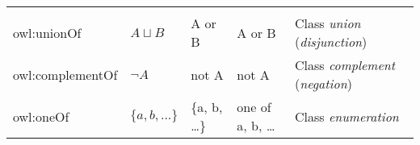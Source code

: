 \documentclass[a4paper,]{report}
\begin{document}
\begin{longtable}[]{@{}lllll@{}}
\begin{minipage}[t]{0.14\columnwidth}
\end{minipage}\tabularnewline
\begin{minipage}[t]{0.18\columnwidth}\raggedright
owl:unionOf\strut
\end{minipage} & \begin{minipage}[t]{0.16\columnwidth}\raggedright
\(A\sqcup B\)\strut
\end{minipage} & \begin{minipage}[t]{0.17\columnwidth}\raggedright
A or B\strut
\end{minipage} & \begin{minipage}[t]{0.20\columnwidth}\raggedright
A or B\strut
\end{minipage} & \begin{minipage}[t]{0.14\columnwidth}\raggedright
Class \emph{union} (\emph{disjunction})\strut
\end{minipage}\tabularnewline
\begin{minipage}[t]{0.18\columnwidth}\raggedright
owl:complementOf\strut
\end{minipage} & \begin{minipage}[t]{0.16\columnwidth}\raggedright
\(\lnot A\)\strut
\end{minipage} & \begin{minipage}[t]{0.17\columnwidth}\raggedright
not A\strut
\end{minipage} & \begin{minipage}[t]{0.20\columnwidth}\raggedright
not A\strut
\end{minipage} & \begin{minipage}[t]{0.14\columnwidth}\raggedright
Class \emph{complement} (\emph{negation})\strut
\end{minipage}\tabularnewline
\begin{minipage}[t]{0.18\columnwidth}\raggedright
owl:oneOf\strut
\end{minipage} & \begin{minipage}[t]{0.16\columnwidth}\raggedright
\(\{a, b, ...\}\)\strut
\end{minipage} & \begin{minipage}[t]{0.17\columnwidth}\raggedright
\{a, b, \ldots{}\}\strut
\end{minipage} & \begin{minipage}[t]{0.20\columnwidth}\raggedright
one of a, b, \ldots{}\strut
\end{minipage} & \begin{minipage}[t]{0.14\columnwidth}\raggedright
Class \emph{enumeration}\strut
\end{minipage}\tabularnewline

\end{longtable}
\end{document}

